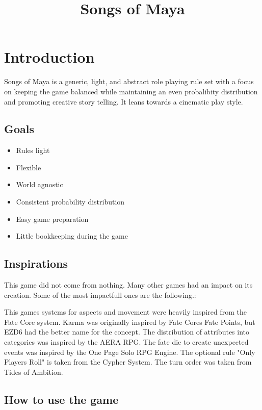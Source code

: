 \documentclass[11pt]{article}
\date{}
\title{Songs of Maya}
\begin{document}
\maketitle
\tableofcontents

{

\newpage
\section{Introduction}
\label{sec:org04ee2ce}

Songs of Maya is a generic, light, and abstract role playing rule set with a focus on keeping the game balanced while maintaining an even probalibity distribution and promoting creative story telling. It leans towards a cinematic play style.
\subsection{Goals}
\label{sec:org23a109f}

\begin{itemize}
\item Rules light
\item Flexible
\item World agnostic
\item Consistent probability distribution
\item Easy game preparation
\item Little bookkeeping during the game
\end{itemize}
\subsection{Inspirations}
\label{sec:org688b12a}

This game did not come from nothing. Many other games had an impact on its creation. Some of the most impactfull ones are the following.:

This games systems for aspects and movement were heavily inspired from the Fate Core system.
Karma was originally inspired by Fate Cores Fate Points, but EZD6 had the better name for the concept.
The distribution of attributes into categories was inspired by the AERA RPG.
The fate die to create unexpected events was inspired by the One Page Solo RPG Engine.
The optional rule "Only Players Roll" is taken from the Cypher System.
The turn order was taken from Tides of Ambition.
\subsection{How to use the game}
\label{sec:org0d58259}

}
\end{document}
